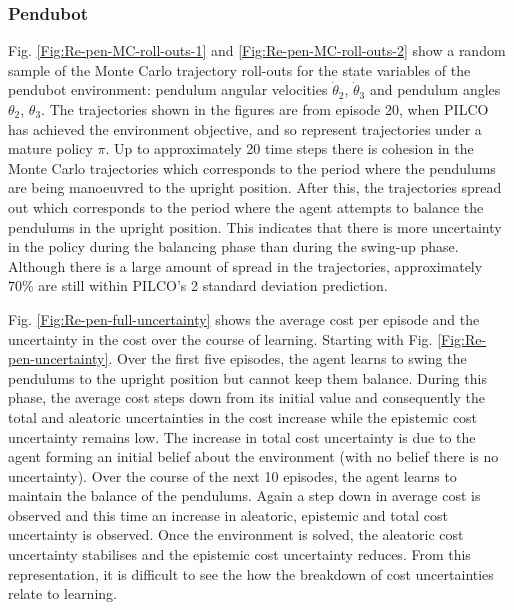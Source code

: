 \subsubsection{Pendubot}
Fig. \ref{Fig:Re-pen-MC-roll-outs-1} and \ref{Fig:Re-pen-MC-roll-outs-2} show a random sample of the Monte Carlo trajectory roll-outs for the state variables of the pendubot environment: pendulum angular velocities $\dot{\theta}_{2}$, $\dot{\theta}_{3}$ and pendulum angles $\theta_{2}$, $\theta_{3}$. The trajectories shown in the figures are from episode 20, when PILCO has achieved the environment objective, and so represent trajectories under a mature policy $\pi$. Up to approximately 20 time steps there is cohesion in the Monte Carlo trajectories which corresponds to the period where the pendulums are being manoeuvred to the upright position. After this, the trajectories spread out which corresponds to the period where the agent attempts to balance the pendulums in the upright position. This indicates that there is more uncertainty in the policy during the balancing phase than during the swing-up phase. Although there is a large amount of spread in the trajectories, approximately $70\%$ are still within PILCO's 2 standard deviation prediction. 

Fig. \ref{Fig:Re-pen-full-uncertainty} shows the average cost per episode and the uncertainty in the cost over the course of learning. Starting with Fig. \ref{Fig:Re-pen-uncertainty}. Over the first five episodes, the agent learns to swing the pendulums to the upright position but cannot keep them balance. During this phase, the average cost steps down from its initial value and consequently the total and aleatoric uncertainties in the cost increase while the epistemic cost uncertainty remains low. The increase in total cost uncertainty is due to the agent forming an initial belief about the environment (with no belief there is no uncertainty). Over the course of the next 10 episodes, the agent learns to maintain the balance of the pendulums. Again a step down in average cost is observed and this time an increase in aleatoric, epistemic and total cost uncertainty is observed. Once the environment is solved, the aleatoric cost uncertainty stabilises and the epistemic cost uncertainty reduces. From this representation, it is difficult to see the how the breakdown of cost uncertainties relate to learning. 

